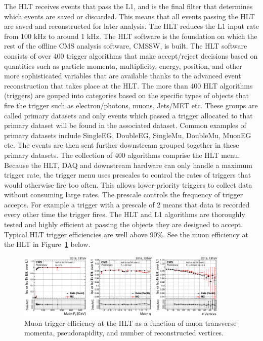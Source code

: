 The HLT receives events that pass the L1, and is the final filter that determines which events are saved or discarded. This means that all events passing the HLT are saved and reconstructed for later analysis.
The HLT reduces the L1 input rate from 100 kHz to around 1 kHz. The HLT software is the foundation on which the rest of the offline CMS analysis software, CMSSW, is built. The HLT software consists of over 400 trigger algorithms that make accept/reject decisions
based on quantities such as particle momenta, multiplicity, energy, position, and other more sophisticated variables that are available thanks to the advanced event reconstruction that takes place at the HLT.
The more than 400 HLT algorithms (triggers) are gouped into categories based on the specific types of objects that fire the trigger such as electron/photons, muons, Jets/MET etc. These groups are called primary datasets and only events which passed a trigger
allocated to that primary dataset will be found in the associated dataset. Common examples of primary datasets include SingleEG, DoubleEG, SingleMu, DoubleMu, MuonEG etc. The events are then sent further downstream grouped together in these primary datasets.
The collection of 400 algorithms comprise the HLT menu.
Because the HLT, DAQ and downstream hardware can only handle a maximum trigger
rate, the trigger menu uses prescales to control the rates of triggers that would otherwise fire too often. This allows lower-priority triggers to collect data
without consuming large rates. The prescale controls the frequency of trigger accepts. For example a trigger with a prescale of 2 means that
data is recorded every other time the trigger fires.
The HLT and L1 algorithms are thoroughly tested and highly efficient at passing the objects they are
designed to accept. Typical HLT trigger efficiencies are well above 90$\%$. See the muon efficiency at the HLT in Figure~\ref{fig:hlt_eff_muons} below. 

\begin{figure}[hbtp]
 \begin{center}
   \includegraphics[width=0.9\textwidth]{ch3_figs/hlt_eff_muons.pdf}
   \caption[Trigger efficiency at the HLT]{Muon trigger efficiency at the HLT as a function of muon transverse momenta, pseudorapidity, and number of reconstructed vertices.}
   \label{fig:hlt_eff_muons}
 \end{center}
\end{figure}

